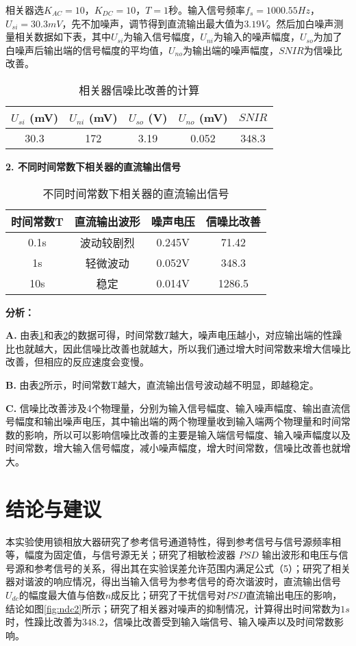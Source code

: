 \documentclass{whureport}
\begin{document}
\begin{multicols}{2}
相关器选$K_{AC}=10$，$K_{DC}=10$，$T=1$秒。输入信号频率$f_s=1000.55\unit{Hz}$，$U_{si}=30.3\unit{mV}$，先不加噪声，调节得到直流输出最大值为$3.19\unit{V}$。然后加白噪声测量相关数据如下表，其中$U_{si}$为输入信号幅度，$U_{ni}$为输入的噪声幅度，$U_{so}$为加了白噪声后输出端的信号幅度的平均值，$U_{no}$为输出端的噪声幅度，$SNIR$为信噪比改善。
\begin{table}[H]
	\centering
	\caption{相关器信噪比改善的计算}
	\begin{tabular}{ccccc}
		\toprule
		$U_{si}$ (mV) & $U_{ni}$ (mV) & $U_{so}$ (V) & $U_{no}$ (mV) & $SNIR$ \\
		\midrule
		30.3 & 172 & 3.19 & 0.052 & 348.3 \\
		\bottomrule
	\end{tabular}
	\label{table:snr}
\end{table}
\textbf{2. 不同时间常数下相关器的直流输出信号}
\begin{table}[H]
	\centering
	\caption{不同时间常数下相关器的直流输出信号}
	\begin{tabular}{cccc}
	\toprule
	时间常数T & 直流输出波形 & 噪声电压 & 信噪比改善 \\
	\midrule
	0.1s & 波动较剧烈 & 0.245V & 71.42 \\
	1s & 轻微波动 & 0.052V & 348.3 \\
	10s & 稳定 & 0.014V & 1286.5 \\
	\bottomrule
	\end{tabular}
	\label{table:snr2}
\end{table}
\textbf{分析：}

\textbf{A.} 由表\ref{table:snr}和表\ref{table:snr2}的数据可得，时间常数$T$越大，噪声电压越小，对应输出端的性躁比也就越大，因此信噪比改善也就越大，所以我们通过增大时间常数来增大信噪比改善，但相应的反应速度会变慢。

\textbf{B.} 由表\ref{table:snr2}所示，时间常数T越大，直流输出信号波动越不明显，即越稳定。

\textbf{C.} 信噪比改善涉及4个物理量，分别为输入信号幅度、输入噪声幅度、输出直流信号幅度和输出噪声电压，其中输出端的两个物理量收到输入端两个物理量和时间常数的影响，所以可以影响信噪比改善的主要是输入端信号幅度、输入噪声幅度以及时间常数，增大输入信号幅度，减小噪声幅度，增大时间常数，信噪比改善也就增大。

\section{结论与建议}

本实验使用锁相放大器研究了参考信号通道特性，得到参考信号与信号源频率相等，幅度为固定值，与信号源无关；研究了相敏检波器 $PSD$ 输出波形和电压与信号源和参考信号的关系，得出其在实验误差允许范围内满足公式（5）；研究了相关器对谐波的响应情况，得出当输入信号为参考信号的奇次谐波时，直流输出信号$U_{dc}$的幅度最大值与倍数$n$成反比；研究了干扰信号对$PSD$直流输出电压的影响，结论如图\ref{fig:ndc2}所示；研究了相关器对噪声的抑制情况，计算得出时间常数为$1\unit{s}$时，性躁比改善为$348.2$，信噪比改善受到输入端信号、输入噪声以及时间常数影响。


\end{multicols}
\end{document}
